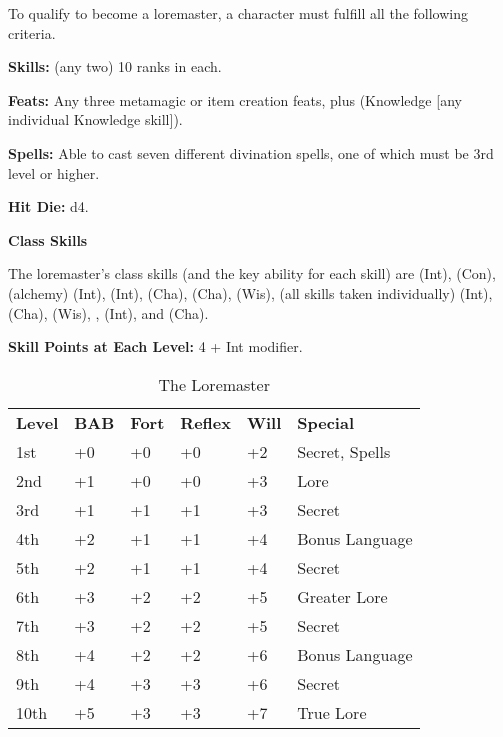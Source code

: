 
\Requirements

To qualify to become a loremaster, a character must fulfill all the following criteria.

\textbf{Skills:}  (any two) 10 ranks in each.

\textbf{Feats:} Any three metamagic or item creation feats, plus  (Knowledge 
[any individual Knowledge skill]).

\textbf{Spells:} Able to cast seven different divination spells, one of which must 
be 3rd level or higher.

\Basics

\textbf{Hit Die:} d4.

\textbf{Class Skills}

The loremaster's class skills (and the key ability for each skill) are  
(Int),  (Con),  (alchemy) (Int),  (Int), 
(Cha),  (Cha),  (Wis),  (all skills taken 
individually) (Int),  (Cha),  (Wis), ,  
(Int), and  (Cha). 

\textbf{Skill Points at Each Level:} 4 + Int modifier.

\begin{table}[htb]
\caption{The Loremaster}
\centering
\begin{tabular}{*{6}{l}}
\textbf{Level} & \textbf{BAB} & \textbf{Fort} & \textbf{Reflex} & \textbf{Will} & \textbf{Special}\\
1st & +0 & +0 & +0 & +2 & Secret, Spells\\
2nd & +1 & +0 & +0 & +3 & Lore\\
3rd & +1 & +1 & +1 & +3 & Secret \\
4th & +2 & +1 & +1 & +4 & Bonus Language \\
5th & +2 & +1 & +1 & +4 & Secret \\
6th & +3 & +2 & +2 & +5 & Greater Lore \\
7th & +3 & +2 & +2 & +5 & Secret \\
8th & +4 & +2 & +2 & +6 & Bonus Language \\
9th & +4 & +3 & +3 & +6 & Secret \\
10th & +5 & +3 & +3 & +7 & True Lore \\
\end{tabular}
\end{table}

